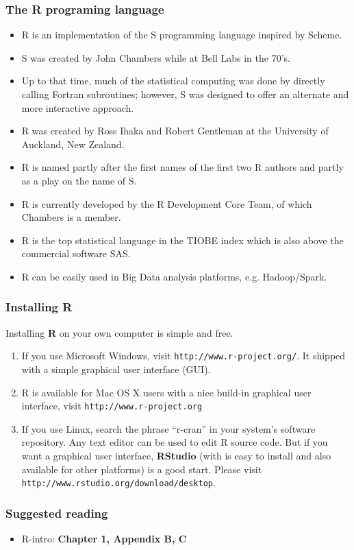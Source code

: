 \documentclass[10pt]{beamer}
\begin{document}
\begin{frame}
  \frametitle{The R programing language}

  \begin{itemize}
  \item R is an implementation of the S programming language inspired by Scheme.

  \item S was created by John Chambers while at Bell Labs in the 70's.

  \item Up to that time, much of the statistical computing was done by directly
    calling Fortran subroutines; however, S was designed to offer an alternate
    and more interactive approach.

  \item R was created by Ross Ihaka and Robert Gentleman at the University of
    Auckland, New Zealand.

  \item R is named partly after the first names of the first two R authors and
    partly as a play on the name of S.

  \item R is currently developed by the R Development Core
    Team, of which Chambers is a member.

  \item R is the top statistical language in the TIOBE index which is also
    above the commercial software SAS.

  \item R can be easily used in Big Data analysis platforms, e.g. Hadoop/Spark.

  \end{itemize}
\end{frame}


\begin{frame}
\frametitle{Installing R}
Installing \textbf{R} on your own computer is simple and free.
\begin{enumerate}
\item If you use Microsoft Windows, visit
  \texttt{http://www.r-project.org/}. It shipped with a simple graphical user
  interface (GUI).

\item R is available for Mac OS X users with a nice build-in graphical user
  interface, visit \texttt{http://www.r-project.org}

\item If you use Linux, search the phrase ``r-cran'' in your system's software
  repository. Any text editor can be used to edit R source code. But if you
  want a graphical user interface, \textbf{RStudio} (with is easy to install and also
  available for other platforms) is a good start. Please visit
  \texttt{http://www.rstudio.org/download/desktop}.
\end{enumerate}
\end{frame}


\begin{frame}
  \frametitle{Suggested reading}

  \begin{itemize}
  \item R-intro: \textbf{Chapter 1, Appendix B, C}
  \end{itemize}

\end{frame}
\end{document}
